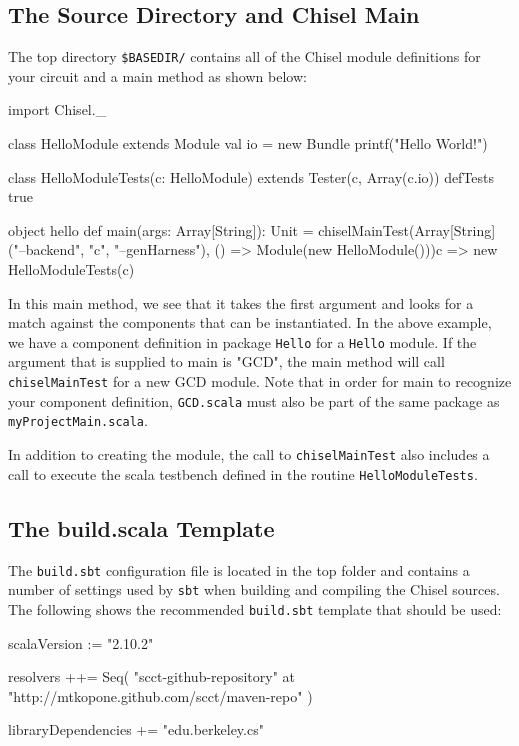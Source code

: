 \documentclass[twocolumn, 10pt]{article}
\begin{document}
\subsection{The Source Directory and Chisel Main}

The top directory \verb+$BASEDIR/+ contains all of the Chisel module definitions for your circuit and a main method as shown below:

\begin{scala}
import Chisel._

class HelloModule extends Module {
  val io = new Bundle {}
  printf("Hello World!\n")
}

class HelloModuleTests(c: HelloModule) extends Tester(c, Array(c.io)) {
  defTests {
    true
  }
}

object hello {
  def main(args: Array[String]): Unit = {
    chiselMainTest(Array[String]("--backend", "c", "--genHarness"),
      () => Module(new HelloModule())){c => new HelloModuleTests(c)}
  }
}
\end{scala}

In this main method, we see that it takes the first argument and looks for a match against the components that can be instantiated. In the above example, we have a component definition in package \verb+Hello+ for a \verb+Hello+ module. If the argument that is supplied to main is "GCD", the main method will call \verb+chiselMainTest+ for a new GCD module. Note that in order for main to recognize your component definition, \verb+GCD.scala+ must also be part of the same package as \verb+myProjectMain.scala+.

In addition to creating the module, the call to \verb+chiselMainTest+ also includes a call to execute the scala testbench defined in the routine \verb+HelloModuleTests+.

\subsection{The build.scala Template}

The \verb+build.sbt+ configuration file is located in the top folder and contains a number of settings used by \verb+sbt+ when building and compiling the Chisel sources.  The following shows the recommended \verb+build.sbt+ template that should be used:

\begin{scala}
scalaVersion := "2.10.2"

resolvers ++= Seq(
  "scct-github-repository" at "http://mtkopone.github.com/scct/maven-repo"
)

libraryDependencies += "edu.berkeley.cs" %
\end{scala}
\end{document}
